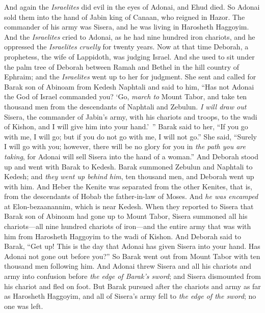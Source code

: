 \begin{biblechapter} %
 And again the \textit{Israelites} did evil in the eyes of Adonai, and Ehud died.
\verse So Adonai sold them into the hand of Jabin king of Canaan, who reigned in Hazor. The commander of his army was Sisera, and he was living in Harosheth Haggoyim.
\verse And the \textit{Israelites} cried to Adonai, as he had nine hundred iron chariots, and he oppressed the \textit{Israelites} \textit{cruelly} for twenty years.
\verse Now at that time Deborah, a prophetess, the wife of Lappidoth, was judging Israel.
\verse And she used to sit under the palm tree of Deborah between Ramah and Bethel in the hill country of Ephraim; and the \textit{Israelites} went up to her for judgment.
\verse She sent and called for Barak son of Abinoam from Kedesh Naphtali and said to him, “Has not Adonai the God of Israel commanded you? ‘Go, \textit{march to} Mount Tabor, and take ten thousand men from the descendants of Naphtali and Zebulun.
\verse \textit{I will draw out} Sisera, the commander of Jabin’s army, with his chariots and troops, to the wadi of Kishon, and I will give him into your hand.’ ”
\verse Barak said to her, “If you go with me, I will go; but if you do not go with me, I will not go.”
\verse She said, “Surely I will go with you; however, there will be no glory for you in \textit{the path you are taking}, for Adonai will sell Sisera into the hand of a woman.” And Deborah stood up and went with Barak to Kedesh.
\verse Barak summoned Zebulun and Naphtali to Kedesh; and \textit{they went up behind him}, ten thousand men, and Deborah went up with him.
\verse And Heber the Kenite was separated from the other Kenites, that is, from the descendants of Hobab the father-in-law of Moses. And \textit{he was encamped} at Elon-bezaanannim, which is near Kedesh.
\verse When they reported to Sisera that Barak son of Abinoam had gone up to Mount Tabor,
\verse Sisera summoned all his chariots—all nine hundred chariots of iron—and the entire army that was with him from Harosheth Haggoyim to the wadi of Kishon.
\verse And Deborah said to Barak, “Get up! This is the day that Adonai has given Sisera into your hand. Has Adonai not gone out before you?” So Barak went out from Mount Tabor with ten thousand men following him.
\verse And Adonai threw Sisera and all his chariots and army into confusion before \textit{the edge of Barak’s sword}; and Sisera dismounted from his chariot and fled on foot.
\verse But Barak pursued after the chariots and army as far as Harosheth Haggoyim, and all of Sisera’s army fell to \textit{the edge of the sword}; no one was left.

\end{biblechapter}
